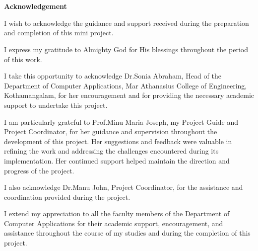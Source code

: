 \documentclass[12pt,a4paper]{report}
\begin{document}
\setcounter{page}{1}
\pagestyle{prelimpages}

\makeatletter
\let\ps@plain\ps@prelimpages
\makeatother

\clearpage
\chapter*{}
\thispagestyle{prelimpages}

\vspace*{-1.0cm}

\begin{center}
    {\fontsize{16pt}{20pt}\selectfont\bfseries Acknowledgement}
\end{center}

\vspace{0.6cm}


\noindent
I wish to acknowledge the guidance and support received during
the preparation and completion of this mini project.

\noindent
I express my gratitude to Almighty God for His blessings
throughout the period of this work.

\noindent
I take this opportunity to acknowledge Dr.Sonia Abraham,
Head of the Department of Computer Applications, Mar Athanasius
College of Engineering, Kothamangalam, for her encouragement
and for providing the necessary academic support to undertake
this project.

\noindent
I am particularly grateful to Prof.Minu Maria Joseph, my
Project Guide and Project Coordinator, for her guidance and
supervision throughout the development of this project. Her
suggestions and feedback were valuable in refining the work
and addressing the challenges encountered during its
implementation. Her continued support helped maintain the
direction and progress of the project.

\noindent
I also acknowledge Dr.Manu John, Project Coordinator, for
the assistance and coordination provided during the project.

\noindent
I extend my appreciation to all the faculty members of the
Department of Computer Applications for their academic support,
encouragement, and assistance throughout the course of my studies
and during the completion of this project.
\end{document}
